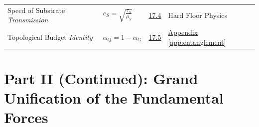 \begin{longtable}{@{} p{4.5cm} p{6cm} c p{4cm} @{}}
Speed of Substrate \newline \textit{Transmission} & $c_S = \sqrt{\frac{\tau_S}{\mu_S}}$ & \hyperref[sec:17.4]{17.4} & Hard Floor Physics \\

Topological Budget \newline \textit{Identity} & $\alpha_Q = 1 - \alpha_G$ & \hyperref[sec:17.5]{17.5} & \hyperref[app:entanglement]{Appendix \ref*{app:entanglement}} \\

\bottomrule
\end{longtable}

\newpage %

\section*{Part II (Continued): Grand Unification of the Fundamental Forces}

